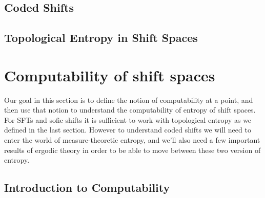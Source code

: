 \documentclass[11pt, reqno]{amsart}
\theoremstyle{plain}
\theoremstyle{definition}
\begin{document}




\subsection{Coded Shifts}\cite[L8]{wolf}

\subsection{Topological Entropy in Shift Spaces}\cite[L5]{wolf}

\section{Computability of shift spaces}

Our goal in this section is to define the notion of computability at a point, and then use that notion to understand the computability of entropy of shift spaces. For SFTs and sofic shifts it is sufficient to work with topological entropy as we defined in the last section. However to understand coded shifts we will need to enter the world of measure-theoretic entropy, and we'll also need a few important results of ergodic theory in order to be able to move between these two version of entropy.

\subsection{Introduction to Computability}\cite[L6, L7]{wolf}   
\end{document}
